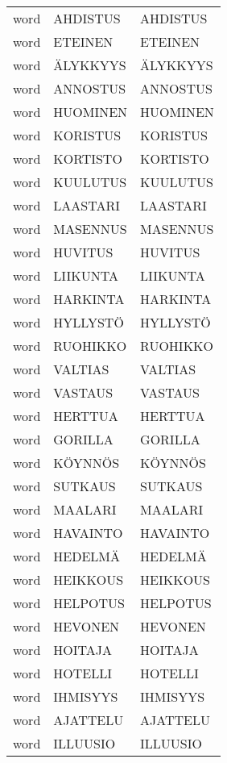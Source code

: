 \begin{supertabular}{lll}
 word &  AHDISTUS &       AHDISTUS \\
 word &   ETEINEN &        ETEINEN \\
 word &  ÄLYKKYYS &       ÄLYKKYYS \\
 word &  ANNOSTUS &       ANNOSTUS \\
 word &  HUOMINEN &       HUOMINEN \\
 word &  KORISTUS &       KORISTUS \\
 word &  KORTISTO &       KORTISTO \\
 word &  KUULUTUS &       KUULUTUS \\
 word &  LAASTARI &       LAASTARI \\
 word &  MASENNUS &       MASENNUS \\
 word &   HUVITUS &        HUVITUS \\
 word &  LIIKUNTA &       LIIKUNTA \\
 word &  HARKINTA &       HARKINTA \\
 word &  HYLLYSTÖ &       HYLLYSTÖ \\
 word &  RUOHIKKO &       RUOHIKKO \\
 word &   VALTIAS &        VALTIAS \\
 word &   VASTAUS &        VASTAUS \\
 word &   HERTTUA &        HERTTUA \\
 word &   GORILLA &        GORILLA \\
 word &   KÖYNNÖS &        KÖYNNÖS \\
 word &   SUTKAUS &        SUTKAUS \\
 word &   MAALARI &        MAALARI \\
 word &  HAVAINTO &       HAVAINTO \\
 word &   HEDELMÄ &        HEDELMÄ \\
 word &  HEIKKOUS &       HEIKKOUS \\
 word &  HELPOTUS &       HELPOTUS \\
 word &   HEVONEN &        HEVONEN \\
 word &   HOITAJA &        HOITAJA \\
 word &   HOTELLI &        HOTELLI \\
 word &  IHMISYYS &       IHMISYYS \\
 word &  AJATTELU &       AJATTELU \\
 word &  ILLUUSIO &       ILLUUSIO \\

\end{supertabular}
